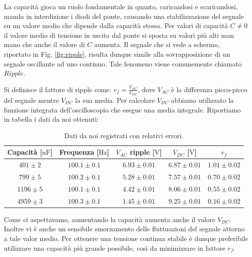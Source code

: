 La capacità gioca un ruolo fondamentale in quanto, caricandosi e scaricandosi, manda in interdizione i diodi del ponte, causando una stabilizzazione del segnale su un valore medio che dipende dalla capacità stessa. Per valori di capacità $C\neq 0$ il valore medio di tensione in uscita dal ponte si sposta su valori più alti man mano che anche il valore di $C$ aumenta.
Il segnale che si vede a schermo, riportato in Fig. \ref{fig:ripple}, risulta dunque simile alla sovrapposizione di un segnale oscillante ad uno continuo. Tale fenomeno viene comunemente chiamato $Ripple$.

Si definisce il fattore di ripple come: $r_f= \frac{V_{AC}}{V_{DC}}$, dove $V_{AC}$ è la differenza picco-picco del segnale mentre $V_{DC}$ la sua media. Per calcolare $V_{DC}$ abbiamo utilizzato la funzione integrata dell'oscilloscopio che esegue una media integrale. Riportiamo in tabella i dati da noi ottenuti:

\begin{table}[H]
\center
\caption{Dati da noi registrati con relativi errori.}
{\renewcommand{\arraystretch}{1.6}%
\begin{tabular}{c|c|c|c|c}
Capacità [$\si{\nano\farad}$] & Frequenza [$\si{\hertz}$] & $V_{AC}$ ripple [$\si{\volt}$] & $V_{DC}$ [$\si{\volt}$] & $r_f$ \\      \hline
$401 \pm 2$ &$100.1 \pm 0.1 $& $6.93 \pm 0.01$ & $6.87 \pm 0.01$ & $1.01 \pm 0.02$\\
$799 \pm 5$ &$100.2 \pm 0.1$& $5.28 \pm 0.01$ & $7.57 \pm 0.01$ & $0.70 \pm 0.02$\\
$1196 \pm 5$ &$100.1 \pm 0.1$& $4.42 \pm 0.01$ & $8.06 \pm 0.01$ & $0.55 \pm 0.02$\\
$4959 \pm 3$ &$100.3 \pm 0.1$& $1.45 \pm 0.01$ & $9.25 \pm 0.01$& $0.16 \pm 0.02$\\
\end{tabular}}
\end{table}

Come ci aspettavamo, aumentando la capacità aumenta anche il valore $V_{DC}$. Inoltre vi è anche un sensibile smorzamento delle fluttuazioni del segnale attorno a tale valor medio. Per ottenere una tensione continua stabile è dunque preferibile utilizzare una capacità più grande possibile, così da minimizzare in fattore $r_f$.

